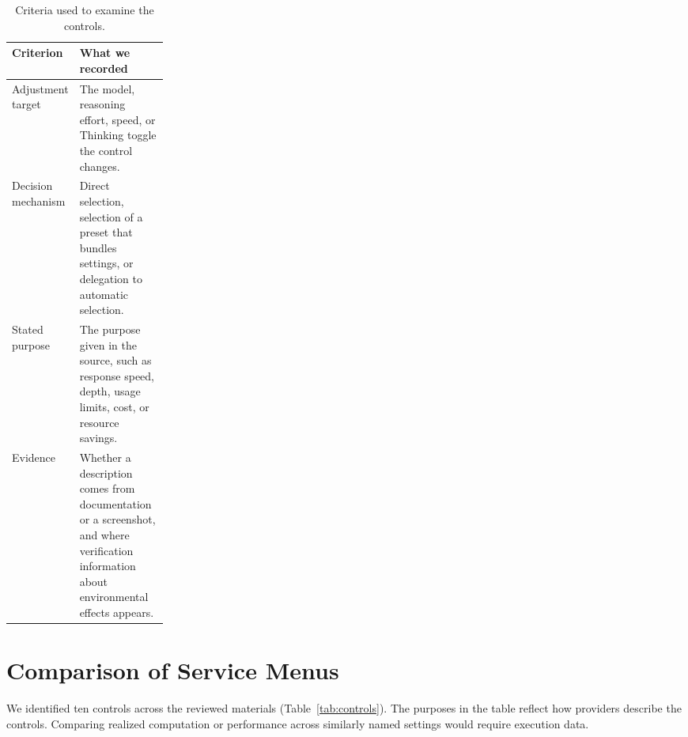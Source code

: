 \documentclass[11pt,letterpaper]{article}
\begin{document}
\begin{table}[H]
\centering
\caption{Criteria used to examine the controls.}
\label{tab:criteria}
\small
\begin{tabularx}{\linewidth}{@{}L{0.23\linewidth}Y@{}}
\toprule
\textbf{Criterion} & \textbf{What we recorded} \\
\midrule
Adjustment target &
The model, reasoning effort, speed, or Thinking toggle the control changes. \\
Decision mechanism &
Direct selection, selection of a preset that bundles settings, or
delegation to automatic selection. \\
Stated purpose &
The purpose given in the source, such as response speed, depth, usage
limits, cost, or resource savings. \\
Evidence &
Whether a description comes from documentation or a screenshot,
and where verification information about environmental effects appears. \\
\bottomrule
\end{tabularx}
\end{table}

\section{Comparison of Service Menus}

We identified ten controls across the reviewed materials
(Table~\ref{tab:controls}). The purposes in the table reflect how
providers describe the controls. Comparing realized computation or
performance across similarly named settings would require execution
data.
\end{document}
